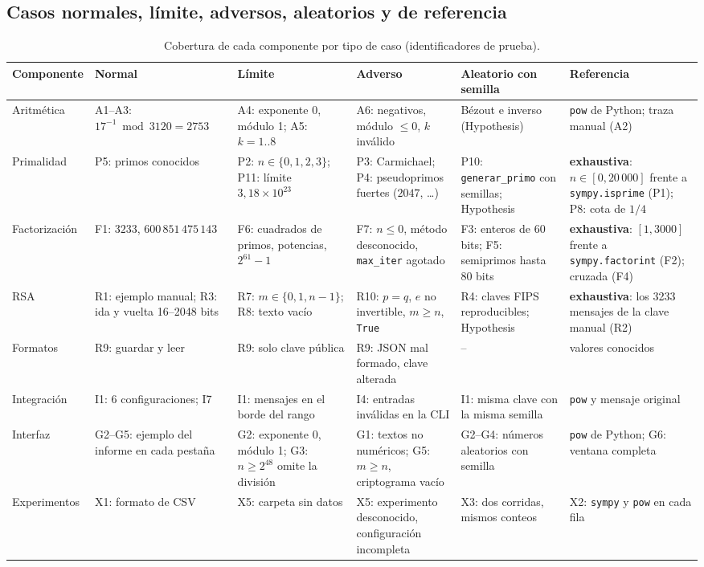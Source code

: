 \subsection{Casos normales, límite, adversos, aleatorios y de referencia}

\begin{table}[H]
\centering
\caption{Cobertura de cada componente por tipo de caso (identificadores de prueba).}
\label{tab:bateria}
\scriptsize
\renewcommand{\arraystretch}{1.25}
\begin{tabularx}{\linewidth}{@{}R{1.9cm} Y Y Y Y Y@{}}
\toprule
\textbf{Componente} & \textbf{Normal} & \textbf{Límite} & \textbf{Adverso} & \textbf{Aleatorio con semilla} & \textbf{Referencia}\\
\midrule
Aritmética & A1--A3: $17^{-1}\bmod3120=2753$ & A4: exponente 0, módulo 1; A5: $k=1..8$ & A6: negativos, módulo $\le0$, $k$ inválido & Bézout e inverso (Hypothesis) & \texttt{pow} de Python; traza manual (A2)\\
Primalidad & P5: primos conocidos & P2: $n\in\{0,1,2,3\}$; P11: límite $3{,}18\times10^{23}$ & P3: Carmichael; P4: pseudoprimos fuertes ($2047$, \dots) & P10: \texttt{generar\_primo} con semillas; Hypothesis & \textbf{exhaustiva}: $n\in[0,20\,000]$ frente a \texttt{sympy.isprime} (P1); P8: cota de $1/4$\\
Factorización & F1: $3233$, $600\,851\,475\,143$ & F6: cuadrados de primos, potencias, $2^{61}-1$ & F7: $n\le0$, método desconocido, \texttt{max\_iter} agotado & F3: enteros de 60 bits; F5: semiprimos hasta 80 bits & \textbf{exhaustiva}: $[1,3000]$ frente a \texttt{sympy.factorint} (F2); cruzada (F4)\\
RSA & R1: ejemplo manual; R3: ida y vuelta 16--2048 bits & R7: $m\in\{0,1,n-1\}$; R8: texto vacío & R10: $p=q$, $e$ no invertible, $m\ge n$, \texttt{True} & R4: claves FIPS reproducibles; Hypothesis & \textbf{exhaustiva}: los 3233 mensajes de la clave manual (R2)\\
Formatos & R9: guardar y leer & R9: solo clave pública & R9: JSON mal formado, clave alterada & -- & valores conocidos\\
Integración & I1: 6 configuraciones; I7 & I1: mensajes en el borde del rango & I4: entradas inválidas en la CLI & I1: misma clave con la misma semilla & \texttt{pow} y mensaje original\\
Interfaz & G2--G5: ejemplo del informe en cada pestaña & G2: exponente 0, módulo 1; G3: $n \ge 2^{48}$ omite la división & G1: textos no numéricos; G5: $m \ge n$, criptograma vacío & G2--G4: números aleatorios con semilla & \texttt{pow} de Python; G6: ventana completa\\
Experimentos & X1: formato de CSV & X5: carpeta sin datos & X5: experimento desconocido, configuración incompleta & X3: dos corridas, mismos conteos & X2: \texttt{sympy} y \texttt{pow} en cada fila\\
\bottomrule
\end{tabularx}
\end{table}

